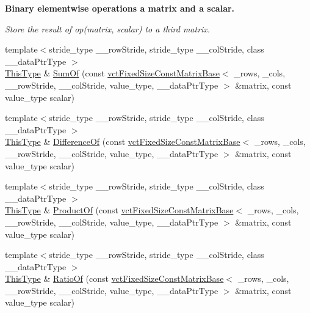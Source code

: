 \begin{Indent}{\bf Binary elementwise operations a matrix and a scalar.}\par
{\em Store the result of op(matrix, scalar) to a third matrix. }\begin{DoxyCompactItemize}
\item 
{\footnotesize template$<$stride\-\_\-type \-\_\-\-\_\-row\-Stride, stride\-\_\-type \-\_\-\-\_\-col\-Stride, class \-\_\-\-\_\-data\-Ptr\-Type $>$ }\\\hyperlink{classvct_fixed_size_const_matrix_base_a7ec66a96ed7e08ce9ff54093133c9d8d}{This\-Type} \& \hyperlink{classvct_fixed_size_matrix_base_a8229148f8d967fb2e396bb8b33b8d149}{Sum\-Of} (const \hyperlink{classvct_fixed_size_const_matrix_base}{vct\-Fixed\-Size\-Const\-Matrix\-Base}$<$ \-\_\-rows, \-\_\-cols, \-\_\-\-\_\-row\-Stride, \-\_\-\-\_\-col\-Stride, value\-\_\-type, \-\_\-\-\_\-data\-Ptr\-Type $>$ \&matrix, const value\-\_\-type scalar)
\item 
{\footnotesize template$<$stride\-\_\-type \-\_\-\-\_\-row\-Stride, stride\-\_\-type \-\_\-\-\_\-col\-Stride, class \-\_\-\-\_\-data\-Ptr\-Type $>$ }\\\hyperlink{classvct_fixed_size_const_matrix_base_a7ec66a96ed7e08ce9ff54093133c9d8d}{This\-Type} \& \hyperlink{classvct_fixed_size_matrix_base_a0e881648fac52ed800c099367ab7d031}{Difference\-Of} (const \hyperlink{classvct_fixed_size_const_matrix_base}{vct\-Fixed\-Size\-Const\-Matrix\-Base}$<$ \-\_\-rows, \-\_\-cols, \-\_\-\-\_\-row\-Stride, \-\_\-\-\_\-col\-Stride, value\-\_\-type, \-\_\-\-\_\-data\-Ptr\-Type $>$ \&matrix, const value\-\_\-type scalar)
\item 
{\footnotesize template$<$stride\-\_\-type \-\_\-\-\_\-row\-Stride, stride\-\_\-type \-\_\-\-\_\-col\-Stride, class \-\_\-\-\_\-data\-Ptr\-Type $>$ }\\\hyperlink{classvct_fixed_size_const_matrix_base_a7ec66a96ed7e08ce9ff54093133c9d8d}{This\-Type} \& \hyperlink{classvct_fixed_size_matrix_base_a734b398eaad70f34aff4bf2df23804e8}{Product\-Of} (const \hyperlink{classvct_fixed_size_const_matrix_base}{vct\-Fixed\-Size\-Const\-Matrix\-Base}$<$ \-\_\-rows, \-\_\-cols, \-\_\-\-\_\-row\-Stride, \-\_\-\-\_\-col\-Stride, value\-\_\-type, \-\_\-\-\_\-data\-Ptr\-Type $>$ \&matrix, const value\-\_\-type scalar)
\item 
{\footnotesize template$<$stride\-\_\-type \-\_\-\-\_\-row\-Stride, stride\-\_\-type \-\_\-\-\_\-col\-Stride, class \-\_\-\-\_\-data\-Ptr\-Type $>$ }\\\hyperlink{classvct_fixed_size_const_matrix_base_a7ec66a96ed7e08ce9ff54093133c9d8d}{This\-Type} \& \hyperlink{classvct_fixed_size_matrix_base_a092aaf18830579524f0d8cc4aabad89f}{Ratio\-Of} (const \hyperlink{classvct_fixed_size_const_matrix_base}{vct\-Fixed\-Size\-Const\-Matrix\-Base}$<$ \-\_\-rows, \-\_\-cols, \-\_\-\-\_\-row\-Stride, \-\_\-\-\_\-col\-Stride, value\-\_\-type, \-\_\-\-\_\-data\-Ptr\-Type $>$ \&matrix, const value\-\_\-type scalar)

\end{DoxyCompactItemize}
\end{Indent}

